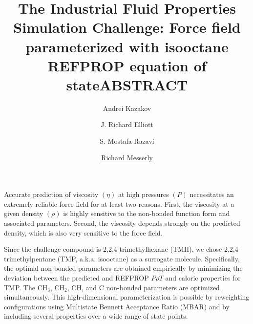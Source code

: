\documentclass[11pt,a4paper]{article}
\begin{document}
	\thispagestyle{empty}
	\title{\Large \textbf{The Industrial Fluid Properties Simulation Challenge: Force field parameterized with isooctane REFPROP equation of state}}
	\author[1]{\large {Andrei Kazakov}}
	\author[3]{\large {J. Richard Elliott}}
	\author[3]{\large {S. Mostafa Razavi}}
	\author[1]{\large {\underline{Richard Messerly}}}%

	
	
	\date{} %
	\maketitle\thispagestyle{empty} %
	\begin{center}
		\title{\textbf{ABSTRACT}}\centering{}
	\end{center}
	\justify
	
	
	
	
	
	Accurate prediction of viscosity $(\eta)$ at high pressures $(P)$ necessitates an extremely reliable force field for at least two reasons. First, the viscosity at a given density $(\rho)$ is highly sensitive to the non-bonded function form and associated parameters. Second, the viscosity depends strongly on the predicted density, which is also very sensitive to the force field. 
	
	Since the challenge compound is 2,2,4-trimethylhexane (TMH), we chose 2,2,4-trimethylpentane (TMP, a.k.a. isooctane) as a surrogate molecule. Specifically, the optimal non-bonded parameters are obtained empirically by minimizing the deviation between the predicted and REFPROP $P\rho T$ and caloric properties for TMP. The CH$_3$, CH$_2$, CH, and C non-bonded parameters are optimized simultaneously. This high-dimensional parameterization is possible by reweighting configurations using Multistate Bennett Acceptance Ratio (MBAR) and by including several properties over a wide range of state points.  
	
\end{document}
